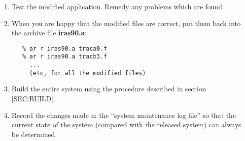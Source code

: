 \begin{enumerate}
\item Test the modified application. Remedy any problems which are found.

\item When you are happy that the modified files are correct, put them back into
the archive file {\bf iras90.a}:

\small
\begin{verbatim}
   % ar r iras90.a traca0.f
   % ar r iras90.a tracb3.f
     ...
     (etc, for all the modified files)
\end{verbatim}
\normalsize

\item Build the entire system using the procedure described in section
\ref{SEC:BUILD}.

\item Record the changes made in the ``system maintenance log file'' so that the
current state of the system (compared with the released system) can always be
determined.

\end{enumerate}

